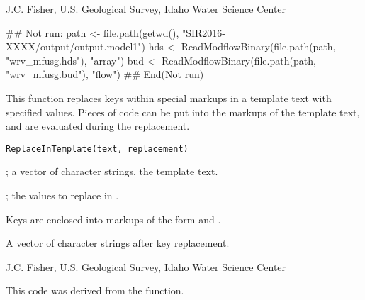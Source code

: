 \documentclass[a4paper]{book}
\begin{document}
%
\begin{Author}\relax
J.C. Fisher, U.S. Geological Survey, Idaho Water Science Center
\end{Author}
%
\begin{SeeAlso}\relax
{}
\end{SeeAlso}
%
\begin{Examples}
\begin{ExampleCode}
## Not run: 
path <- file.path(getwd(), "SIR2016-XXXX/output/output.model1")
hds <- ReadModflowBinary(file.path(path, "wrv_mfusg.hds"), "array")
bud <- ReadModflowBinary(file.path(path, "wrv_mfusg.bud"), "flow")
## End(Not run)
\end{ExampleCode}
\end{Examples}
%
\begin{Description}\relax
This function replaces keys within special markups in a template text with specified values.
Pieces of \R{} code can be put into the markups of the template text, and are evaluated during the replacement.
\end{Description}
%
\begin{Usage}
\begin{verbatim}
ReplaceInTemplate(text, replacement)
\end{verbatim}
\end{Usage}
%
\begin{Arguments}
\begin{ldescription}
\item[\code{text}] ; a vector of character strings, the template text.
\item[\code{replacement}] ; the values to replace in .
\end{ldescription}
\end{Arguments}
%
\begin{Details}\relax
Keys are enclosed into markups of the form  and .
\end{Details}
%
\begin{Value}
A vector of character strings after key replacement.
\end{Value}
%
\begin{Author}\relax
J.C. Fisher, U.S. Geological Survey, Idaho Water Science Center
\end{Author}
%
\begin{References}\relax
This code was derived from the  function.
\end{References}
\end{document}
